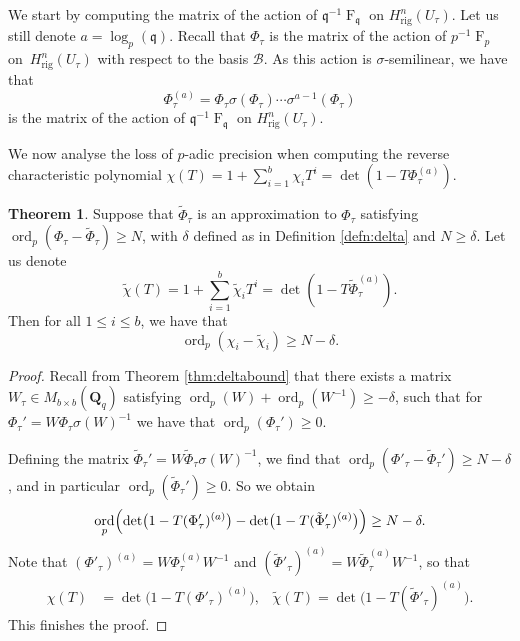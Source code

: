 \documentclass[a4paper,11pt]{article}
\numberwithin{equation}{section}
\newcommand{\QQ}{\mathbf{Q}} %
\DeclareMathOperator{\ord}{ord}          %
\DeclareMathOperator{\Frob}{F}           %
\providecommand{\Hrig}{H_{\text{rig}}}  %
\providecommand{\cB}{\mathcal{B}} %
\theoremstyle{definition}
\newtheorem{thm}{Theorem}[section]
\begin{document}
We start by computing the matrix of the action of $\mathfrak{q}^{-1} \Frob_{\mathfrak{q}}$ on $\Hrig^n(U_{\tau})$.
Let us still denote $a=\log_p(\mathfrak{q})$. Recall that $\Phi_{\tau}$ is the matrix of the action 
of $p^{-1} \Frob_p$ on~$\Hrig^{n}(U_{\tau})$ with respect to the basis $\cB$. As this action is 
$\sigma$-semilinear, we have that 
\begin{equation*}
\Phi_{\tau}^{(a)} = 
    \Phi_{\tau} \sigma(\Phi_{\tau}) \dotsm \sigma^{a-1}(\Phi_{\tau})
\end{equation*}
is the matrix of the action of $\mathfrak{q}^{-1} \Frob_{\mathfrak{q}}$ on $\Hrig^n(U_{\tau})$. 

We now analyse the loss of $p$-adic precision when computing the reverse characteristic polynomial 
$\chi(T)=1+\sum_{i=1}^b \chi_i T^i=\det( 1 - T \Phi_{\tau}^{(a)})$.  

\begin{thm} \label{thm:preccharpoly}
Suppose that $\tilde{\Phi}_{\tau}$ is an approximation to 
$\Phi_{\tau}$ satisfying
$\ord_p (\Phi_{\tau}-\tilde{\Phi}_{\tau}) \geq N$,
with $\delta$ defined as in Definition \ref{defn:delta} and $N \geq \delta$. Let us denote
\[
\tilde{\chi}(T)=1+\sum_{i=1}^b \tilde{\chi}_i T^i = \det( 1 - T \tilde{\Phi}_{\tau}^{(a)}).
\]
Then for all $1 \leq i \leq b$, we have that 
\[
\ord_p (\chi_i - \tilde{\chi}_i) \geq N-\delta.
\]
\end{thm}

\begin{proof} 
Recall from Theorem \ref{thm:deltabound} that there exists a matrix $W_{\tau} \in M_{b \times b}(\QQ_q)$
satisfying $\ord_p(W)+\ord_p(W^{-1}) \geq -\delta$, such that for $\Phi_{\tau}'=W \Phi_{\tau} \sigma(W)^{-1}$ 
we have that $\ord_p(\Phi_{\tau}') \geq 0$. 

Defining the matrix $\tilde{\Phi}_{\tau}'=W \tilde{\Phi}_{\tau} \sigma(W)^{-1}$,
we find that $\ord_p(\Phi'_{\tau}-\tilde{\Phi}_{\tau}') \geq N-\delta$, and in particular
$\ord_p(\tilde{\Phi}_{\tau}') \geq 0$. So we obtain
\[
\ord_p \Bigl( \det\bigl(1 - T (\Phi'_{\tau})^{(a)}\bigr) 
            - \det\bigl(1 - T (\tilde{\Phi}'_{\tau})^{(a)}\bigr) \Bigr) \geq N-\delta.
\] 
Note that $(\Phi'_{\tau})^{(a)}= W \Phi_{\tau}^{(a)} W^{-1}$
and $(\tilde{\Phi}'_{\tau})^{(a)}= W \tilde{\Phi}_{\tau}^{(a)} W^{-1}$, so that
\begin{align*}
\chi(T)&=\det\bigl(1 - T (\Phi'_{\tau})^{(a)}\bigr), \; \; \; 
\tilde{\chi}(T)=\det\bigl(1 - T (\tilde{\Phi}'_{\tau})^{(a)}\bigr).
\end{align*}
This finishes the proof.
\end{proof}
\end{document}

